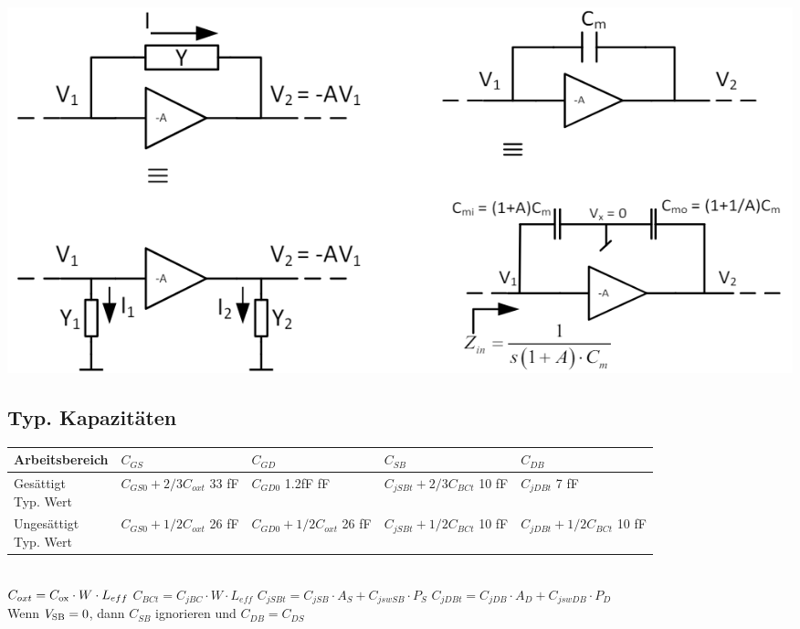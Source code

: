 \begin{minipage}{0.5\linewidth}
\includegraphics[width=0.9\linewidth]{Miller Approximation.png}
\end{minipage}
\subsection{Typ. Kapazitäten}
\begin{tabular}{|l|l|l|l|l|}
\hline
Arbeitsbereich & $C_{GS}$  & $C_{GD}$  & $C_{SB}$  & $C_{DB}$\\
\hline
\makecell[l]{Gesättigt\\ Typ. Wert} & \makecell[l]{$C_{GS0}+ 2/3C_{oxt}$\\ 33 fF} & \makecell[l]{$C_{GD0}$\\ 1.2fF fF} & \makecell[l]{$C_{jSBt}+ 2/3C_{BCt}$\\ 10 fF} & \makecell[l]{$C_{jDBt}$\\ 7 fF}\\
\hline
\makecell[l]{Ungesättigt\\ Typ. Wert} & \makecell[l]{$C_{GS0}+ 1/2C_{oxt}$\\ 26 fF} & \makecell[l]{$C_{GD0}+ 1/2C_{oxt}$\\ 26 fF} & \makecell[l]{$C_{jSBt}+ 1/2C_{BCt}$\\ 10 fF} & \makecell[l]{$C_{jDBt}+ 1/2C_{BCt}$\\ 10 fF}\\
\hline
\end{tabular}\\
$C_{oxt} = C_{\rm ox}\cdot W \cdot L_{eff}$\hspace{20pt} $C_{BCt} = C_{jBC}\cdot W \cdot L_{eff}$\hspace{20pt} $C_{jSBt} = C_{jSB}\cdot A_S +C_{jswSB}\cdot P_S$ \hspace{20pt} $C_{jDBt} = C_{jDB}\cdot A_D + C_{jswDB} \cdot P_D$\\
Wenn $V_{\rm SB} = 0$, dann $C_{SB}$ ignorieren und $C_{DB} = C_{DS}$
